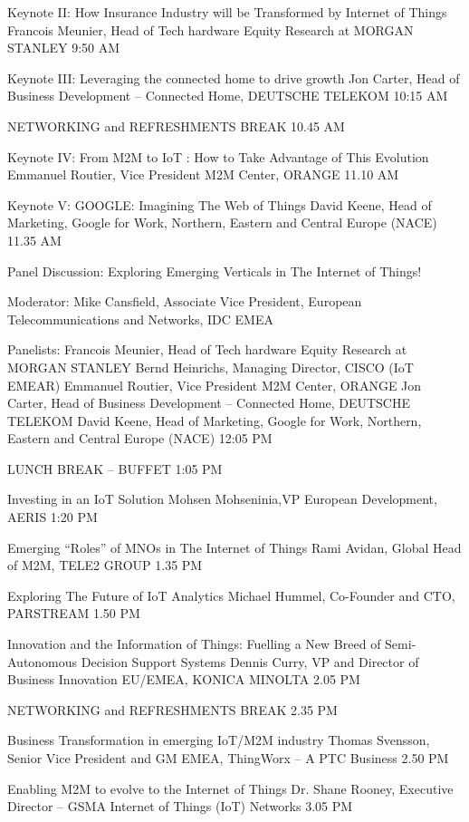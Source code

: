 \documentclass{report}
\begin{document}
Keynote II: How Insurance Industry will be Transformed by Internet of Things 
Francois Meunier, Head of Tech hardware Equity Research at MORGAN STANLEY
9:50 AM
	
Keynote III:  Leveraging the connected home to drive growth  
Jon Carter, Head of Business Development – Connected Home, DEUTSCHE TELEKOM
10:15 AM
	
NETWORKING and  REFRESHMENTS BREAK
10.45 AM
	
Keynote IV: From M2M to IoT : How to Take Advantage of This Evolution
Emmanuel Routier, Vice President M2M Center, ORANGE
11.10 AM
	
Keynote V: GOOGLE:  Imagining The Web of Things
David Keene, Head of Marketing, Google for Work, Northern, Eastern and  Central Europe (NACE)
11.35 AM
	
Panel Discussion: Exploring Emerging Verticals in The Internet of Things! 
 
Moderator:
Mike Cansfield, Associate Vice President, European Telecommunications and  Networks, IDC EMEA
 
Panelists:
Francois Meunier, Head of Tech hardware Equity Research at MORGAN STANLEY
Bernd Heinrichs, Managing Director, CISCO (IoT EMEAR)
Emmanuel Routier, Vice President M2M Center, ORANGE
Jon Carter, Head of Business Development – Connected Home, DEUTSCHE TELEKOM
David Keene, Head of Marketing, Google for Work, Northern, Eastern and  Central Europe (NACE)
12:05 PM
	
LUNCH BREAK – BUFFET
1:05 PM
	
Investing in an IoT Solution
Mohsen Mohseninia,VP European Development, AERIS
1:20 PM
	
Emerging “Roles” of MNOs in The Internet of Things
Rami Avidan, Global Head of M2M, TELE2 GROUP
1.35 PM
	
Exploring The Future of IoT Analytics
Michael Hummel, Co-Founder and  CTO, PARSTREAM
1.50 PM
	
Innovation and the Information of Things:  Fuelling a New Breed of Semi-Autonomous Decision Support Systems
Dennis Curry, VP and  Director of Business Innovation EU/EMEA, KONICA MINOLTA
2.05 PM
	
NETWORKING and  REFRESHMENTS BREAK
2.35 PM
	
Business Transformation in emerging IoT/M2M industry
Thomas Svensson, Senior Vice President and  GM EMEA, ThingWorx – A PTC Business
2.50 PM
	
Enabling M2M to evolve to the Internet of Things
Dr. Shane Rooney, Executive Director – GSMA Internet of Things (IoT) Networks
3.05 PM
	
\end{document}

